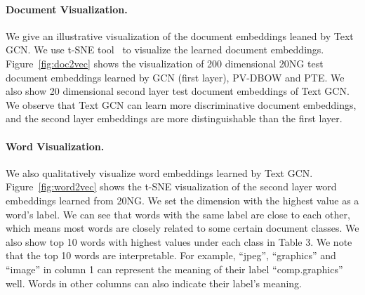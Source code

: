 \documentclass[letterpaper]{article} \usepackage{aaai19}  \usepackage{times}  \usepackage{helvet}  \usepackage{courier}  \usepackage{url}  \usepackage{graphicx}  \frenchspacing  \usepackage{amsmath}
\begin{document}
 

\paragraph{Document Visualization.}
We give an illustrative visualization of the document embeddings leaned by Text GCN. We use t-SNE tool~\cite{maaten2008visualizing} to visualize the learned document embeddings. Figure~\ref{fig:doc2vec} shows the visualization of 200 dimensional 20NG test document embeddings learned by GCN (first layer), PV-DBOW and PTE. We also show 20 dimensional second layer test document embeddings of Text GCN. We observe that Text GCN can learn more discriminative document embeddings, and the second layer embeddings are more distinguishable than the first layer.

\paragraph{Word Visualization.}

We also qualitatively visualize word embeddings learned by Text GCN.
Figure~\ref{fig:word2vec} shows the t-SNE visualization of the second layer word embeddings learned from 20NG. We set the dimension with the highest value as a word's label. We can see that words with the same label are close to each other, which means most words are closely related to some certain document classes. We also show top 10 words with highest values under each class in Table 3. We note that the top 10 words are interpretable. For example, ``jpeg'', ``graphics'' and ``image'' in column 1 can represent the meaning of their label ``comp.graphics'' well. Words in other columns can also indicate their label's meaning. 
\end{document}
